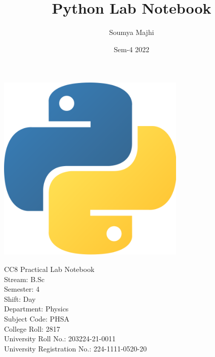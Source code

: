 \documentclass{article}
\title{Python Lab Notebook}
\author{Soumya Majhi}
\date{Sem-4 2022}
\begin{document}
\maketitle
\thispagestyle{empty}

\begin{center}
    \includegraphics[width=9cm, height=9cm]{Images/python_logo.png}
\end{center}


\begin{tcolorbox}[colback=blue!5!white,colframe=blue!75!black]
    \begin{center}
        \Large{CC8 Practical Lab Notebook} \\
        \bigskip
        \large{Stream: B.Sc \\
        \bigskip
        Semester: 4 \\
        \bigskip
        Shift: Day \\
        \bigskip
        Department: Physics \\
        \bigskip
        Subject Code: PHSA \\
        \bigskip
        College Roll: 2817 \\
        \bigskip
        University Roll No.: 203224-21-0011 \\
        \bigskip
        University Registration No.: 224-1111-0520-20
        }
    \end{center}
\end{tcolorbox}
\end{document}
